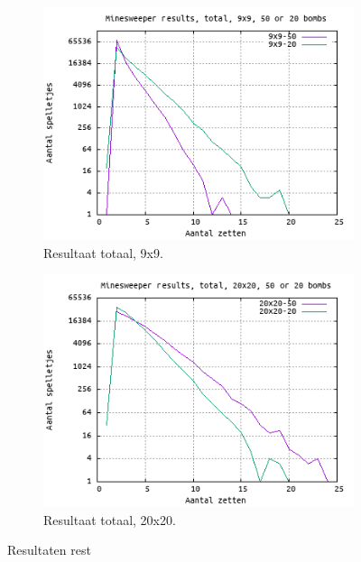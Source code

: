 \documentclass[10pt]{article}
\begin{document}
\begin{figure}[H]
\begin{subfigure}{.49\textwidth}
    \includegraphics[width=1\linewidth]{plot_9_9_total}
    \caption{Resultaat totaal, 9x9. }
    \label{fig:plot_9_9_total}
  \end{subfigure}
  \begin{subfigure}{.49\textwidth}
    \centering
    \includegraphics[width=1\linewidth]{plot_20_20_total}
    \caption{Resultaat totaal, 20x20. }
    \label{fig:plot_20_20_total}
  \end{subfigure}
  \caption{Resultaten rest}
  \label{fig:plots2}
\end{figure}



\end{document}
